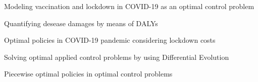 \begin{highlights}
	\item 
		Modeling vaccination and lockdown in COVID-19 as an optimal 
		control problem
	\item
		Quantifying desease damages by means of DALYs 
	\item
		Optimal policies in COVID-19 pandemic considering lockdown 
		costs 
	\item
		Solving optimal applied control problems by using Differential Evolution
	\item
		Piecewise optimal policies in optimal control problems
\end{highlights}